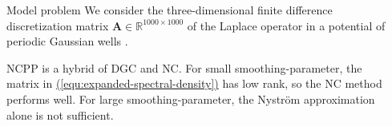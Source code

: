 \documentclass[final, leqno, 12pt]{beamer}
\newcommand{\mtx}[1]{\boldsymbol{#1}}
\newcommand{\vct}[1]{\boldsymbol{#1}}
\newcommand{\refequ}[1]{\hyperref[#1]{\textcolor{linkcolor}{(\ref*{#1})}}}
\let\oldcite\cite
\renewcommand{\cite}[2][]{\textcolor{linkcolor}{\oldcite{#2}}}
\begin{document}
\begin{frame}[t]
\begin{columns}[t]
\end{columns}


\vspace{5pt}
\begin{columns}[t]

    \begin{column}{0.45\paperwidth}

        \begin{block}{Model problem}
            We consider the three-dimensional finite difference discretization matrix
            $\mtx{A} \in \mathbb{R}^{1000 \times 1000}$ of
            the Laplace operator in a potential of periodic Gaussian wells \cite{lin2017randomized}.
            
            \begin{figure}
                \scalebox{1.6}{}
                \scalebox{1.6}{}
                \scalebox{1.6}{}
            \end{figure}

            \gls{NCPP} is a hybrid of \gls{DGC} and \gls{NC}. For small \gls{smoothing-parameter}, the
            matrix in \refequ{equ:expanded-spectral-density} has low rank,
            so the \gls{NC} method performs well. For large \gls{smoothing-parameter},
            the Nystr\"om approximation alone is not sufficient.%
            \begin{figure}
                \scalebox{1.6}{}
            \end{figure}
            \vspace{-30pt}
        \end{block}

    \end{column}

    \begin{column}{0.45\paperwidth}


\end{column}
\end{columns}
\end{frame}
\end{document}
